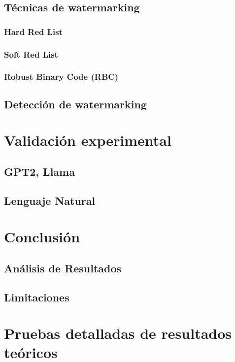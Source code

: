 \documentclass[a4paper,11pt]{article}
\begin{document}
\subsection{Técnicas de watermarking}
\subsubsection{Hard Red List}
\subsubsection{Soft Red List}
\subsubsection{Robust Binary Code (RBC)}
\subsection{Detección de watermarking}
\section{Validación experimental}
\subsection{GPT2, Llama}
\subsection{Lenguaje Natural}
\section{Conclusión}
\subsection{Análisis de Resultados}
\subsection{Limitaciones}
\appendix
\section{Pruebas detalladas de resultados teóricos}
\nocite{*}
\printbibliography
\end{document}
